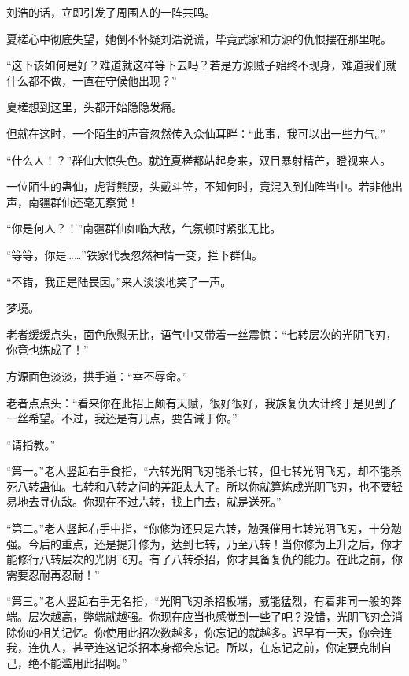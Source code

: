 \begin{this_body}
刘浩的话，立即引发了周围人的一阵共鸣。

夏槎心中彻底失望，她倒不怀疑刘浩说谎，毕竟武家和方源的仇恨摆在那里呢。

“这下该如何是好？难道就这样等下去吗？若是方源贼子始终不现身，难道我们就什么都不做，一直在守候他出现？”

夏槎想到这里，头都开始隐隐发痛。

但就在这时，一个陌生的声音忽然传入众仙耳畔：“此事，我可以出一些力气。”

“什么人！？”群仙大惊失色。就连夏槎都站起身来，双目暴射精芒，瞪视来人。

一位陌生的蛊仙，虎背熊腰，头戴斗笠，不知何时，竟混入到仙阵当中。若非他出声，南疆群仙还毫无察觉！

“你是何人？！”南疆群仙如临大敌，气氛顿时紧张无比。

“等等，你是……”铁家代表忽然神情一变，拦下群仙。

“不错，我正是陆畏因。”来人淡淡地笑了一声。

梦境。

老者缓缓点头，面色欣慰无比，语气中又带着一丝震惊：“七转层次的光阴飞刃，你竟也练成了！”

方源面色淡淡，拱手道：“幸不辱命。”

老者点点头：“看来你在此招上颇有天赋，很好很好，我族复仇大计终于是见到了一丝希望。不过，我还是有几点，要告诫于你。”

“请指教。”

“第一。”老人竖起右手食指，“六转光阴飞刃能杀七转，但七转光阴飞刃，却不能杀死八转蛊仙。七转和八转之间的差距太大了。所以你就算炼成光阴飞刃，也不要轻易地去寻仇敌。你现在不过六转，找上门去，就是送死。”

“第二。”老人竖起右手中指，“你修为还只是六转，勉强催用七转光阴飞刃，十分勉强。今后的重点，还是提升修为，达到七转，乃至八转！当你修为上升之后，你才能修行八转层次的光阴飞刃。有了八转杀招，你才具备复仇的能力。在此之前，你需要忍耐再忍耐！”

“第三。”老人竖起右手无名指，“光阴飞刃杀招极端，威能猛烈，有着非同一般的弊端。层次越高，弊端就越强。你现在应当也感觉到一些了吧？没错，光阴飞刃会消除你的相关记忆。你使用此招次数越多，你忘记的就越多。迟早有一天，你会连我，连仇人，甚至连这记杀招本身都会忘记。所以，在忘记之前，你定要克制自己，绝不能滥用此招啊。”

\end{this_body}

